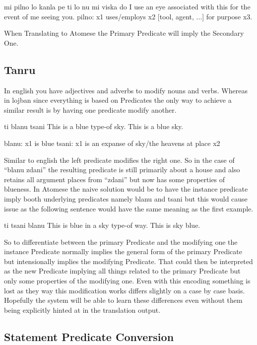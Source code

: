 mi pilno lo kanla pe ti lo nu mi viska do
I use an eye associated with this for the event of me seeing you.
pilno: x1 uses/employs x2 [tool, agent, ...] for purpose x3.

When Translating to Atomese the Primary Predicate will imply the Secondary One.

\subsection{Tanru}

In english you have adjectives and adverbs to modify nouns and verbs. Whereas in lojban since everything is based on Predicates the only way to achieve a similar result is by having one predicate modify another.

\begin{center}
ti blanu tsani
This is a blue type-of sky.
This is a blue sky.

blanu: x1 is blue
tsani: x1 is an expanse of sky/the heavens at place x2
\end{center}

Similar to english the left predicate modifies the right one. So in the case of  “blanu zdani” the resulting predicate is still primarily about a house and also retains all argument places from “zdani” but now has some properties of blueness.
In Atomese the naive solution would be to have the instance predicate imply booth underlying predicates namely blanu and tsani but this would cause issue as the following sentence would have the same meaning as the first example.

\begin{center}
ti tsani blanu
This is blue in a sky type-of way.
This is sky blue.
\end{center}

So to differentiate between the primary Predicate and the modifying one the instance Predicate normally implies the general form of the primary Predicate but intensionally implies the modifying Predicate. That could then be interpreted as the new Predicate implying all things related to the primary Predicate but only some properties of the modifying one. Even with this encoding something is lost as they way this modification works differs slightly on a case by case basis. Hopefully the system will be able to learn these differences even without them being explicitly hinted at in the translation output.

\subsection{Statement Predicate Conversion}

